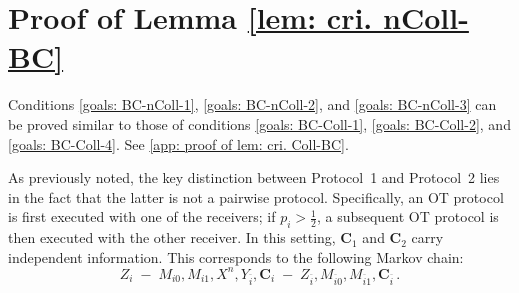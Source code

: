 \documentclass[runningheads]{llncs}
\newcommand{\parbreak}{ \vspace{0.3 em}}
\newcounter{protocol}
\begin{document}
\section{Proof of Lemma \ref{lem: cri. nColl-BC}}\label{app: proof of lem: cri. nColl-BC}
Conditions \eqref{goals: BC-nColl-1}, \eqref{goals: BC-nColl-2}, and \eqref{goals: BC-nColl-3} can be proved similar to those of conditions \eqref{goals: BC-Coll-1}, \eqref{goals: BC-Coll-2}, and \eqref{goals: BC-Coll-4}. See \ref{app: proof of lem: cri. Coll-BC}.

\parbreak As previously noted, the key distinction between Protocol~1 and Protocol~2 lies in the fact that the latter is not a pairwise protocol. Specifically, an OT protocol is first executed with one of the receivers; if $p_i > \tfrac{1}{2}$, a subsequent OT protocol is then executed with the other receiver. In this setting, $\mathbf{C}_1$ and $\mathbf{C}_2$ carry independent information. This corresponds to the following Markov chain:
\[
Z_i \;-\; M_{i0}, M_{i1}, X^n, Y_{\overline{i}}, \mathbf{C}_i \;-\; Z_{\overline{i}}, M_{\overline{i}0}, M_{\overline{i}1}, \mathbf{C}_{\overline{i}} \, .
\]
\end{document}

